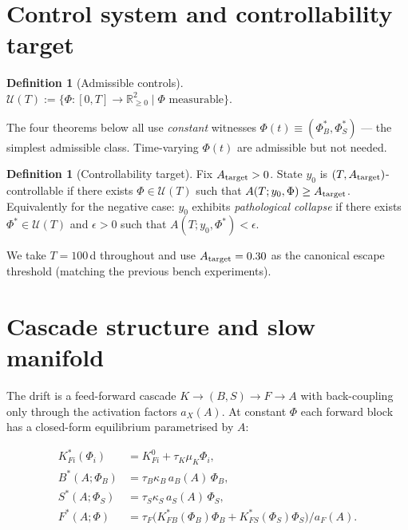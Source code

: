 \documentclass[11pt,a4paper]{article}
\theoremstyle{definition}
\newtheorem{definition}[theorem]{Definition}
\newcommand{\R}{\mathbb{R}}
\begin{document}
\section{Control system and controllability target} \label{sec:control}

\begin{definition}[Admissible controls]
$\mathcal{U}(T) := \{\Phi : [0, T] \to \R_{\ge 0}^2 \mid \Phi \text{ measurable}\}$.
\end{definition}

The four theorems below all use \emph{constant} witnesses $\Phi(t) \equiv (\Phi_B^*, \Phi_S^*)$ — the simplest admissible class. Time-varying $\Phi(t)$ are admissible but not needed.

\begin{definition}[Controllability target]
Fix $A_{\rm target} > 0$. State $y_0$ is $(T, A_{\rm target})$-controllable if there exists $\Phi \in \mathcal{U}(T)$ such that $A(T; y_0, \Phi) \ge A_{\rm target}$. Equivalently for the negative case: $y_0$ exhibits \emph{pathological collapse} if there exists $\Phi^* \in \mathcal{U}(T)$ and $\epsilon > 0$ such that $A(T; y_0, \Phi^*) < \epsilon$.
\end{definition}

We take $T = 100$\,d throughout and use $A_{\rm target} = 0.30$ as the canonical escape threshold (matching the previous bench experiments).

\section{Cascade structure and slow manifold} \label{sec:cascade}

The drift is a feed-forward cascade $K \to (B, S) \to F \to A$ with back-coupling only through the activation factors $a_X(A)$. At constant $\Phi$ each forward block has a closed-form equilibrium parametrised by $A$:

\begin{align}
K_{Fi}^*(\Phi_i) &= K_{Fi}^0 + \tau_K \mu_K \Phi_i, \label{eq:K-star}\\
B^*(A; \Phi_B)   &= \tau_B \kappa_B \, a_B(A) \, \Phi_B, \label{eq:B-star}\\
S^*(A; \Phi_S)   &= \tau_S \kappa_S \, a_S(A) \, \Phi_S, \label{eq:S-star}\\
F^*(A; \Phi)     &= \tau_F \big(K_{FB}^*(\Phi_B) \Phi_B + K_{FS}^*(\Phi_S) \Phi_S\big) / a_F(A). \label{eq:F-star}
\end{align}
\end{document}
